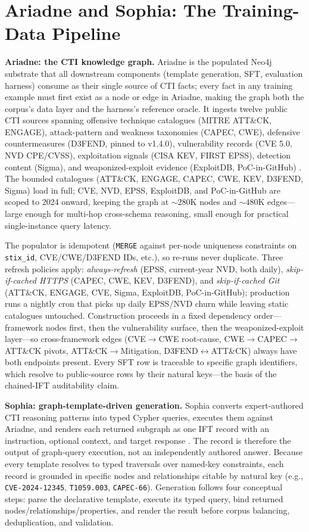 \documentclass[conference]{IEEEtran}
\providecommand{\hfid}[1]{{\small\nolinkurl{#1}}}
\begin{document}
\section{Ariadne and Sophia: The Training-Data Pipeline}
\label{sec:cti-kg}

\textbf{Ariadne: the CTI knowledge graph.} Ariadne is the populated Neo4j substrate that all downstream components (template generation, SFT, evaluation harness) consume as their single source of CTI facts; every fact in any training example must first exist as a node or edge in Ariadne, making the graph both the corpus's data layer and the harness's reference oracle. It ingests twelve public CTI sources spanning offensive technique catalogues (MITRE ATT\&CK, ENGAGE), attack-pattern and weakness taxonomies (CAPEC, CWE), defensive countermeasures (D3FEND, pinned to v1.4.0), vulnerability records (CVE 5.0, NVD CPE/CVSS), exploitation signals (CISA KEV, FIRST EPSS), detection content (Sigma), and weaponized-exploit evidence (ExploitDB, PoC-in-GitHub) \cite{strom2018mitreattck,mitreCAPEC,mitreCWE,mitreCVE}. The bounded catalogues (ATT\&CK, ENGAGE, CAPEC, CWE, KEV, D3FEND, Sigma) load in full; CVE, NVD, EPSS, ExploitDB, and PoC-in-GitHub are scoped to 2024 onward, keeping the graph at ${\sim}280$K nodes and ${\sim}480$K edges---large enough for multi-hop cross-schema reasoning, small enough for practical single-instance query latency.

The populator is idempotent (\texttt{MERGE} against per-node uniqueness constraints on \hfid{stix_id}, CVE/CWE/D3FEND IDs, etc.), so re-runs never duplicate. Three refresh policies apply: \emph{always-refresh} (EPSS, current-year NVD, both daily), \emph{skip-if-cached HTTPS} (CAPEC, CWE, KEV, D3FEND), and \emph{skip-if-cached Git} (ATT\&CK, ENGAGE, CVE, Sigma, ExploitDB, PoC-in-GitHub); production runs a nightly cron that picks up daily EPSS/NVD churn while leaving static catalogues untouched. Construction proceeds in a fixed dependency order---framework nodes first, then the vulnerability surface, then the weaponized-exploit layer---so cross-framework edges (CVE$\to$CWE root-cause, CWE$\to$CAPEC$\to$ATT\&CK pivots, ATT\&CK$\to$Mitigation, D3FEND$\leftrightarrow$ATT\&CK) always have both endpoints present. Every SFT row is traceable to specific graph identifiers, which resolve to public-source rows by their natural keys---the basis of the chained-IFT auditability claim.

\textbf{Sophia: graph-template-driven generation.} Sophia converts expert-authored CTI reasoning patterns into typed Cypher queries, executes them against Ariadne, and renders each returned subgraph as one IFT record with an instruction, optional context, and target response \cite{cardei2025ift}. The record is therefore the output of graph-query execution, not an independently authored answer. Because every template resolves to typed traversals over named-key constraints, each record is grounded in specific nodes and relationships citable by natural key (e.g., \hfid{CVE-2024-12345}, \texttt{T1059.003}, \hfid{CAPEC-66}). Generation follows four conceptual steps: parse the declarative template, execute its typed query, bind returned nodes/relationships/properties, and render the result before corpus balancing, deduplication, and validation.
\end{document}
